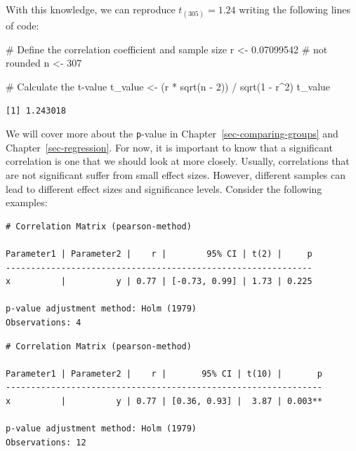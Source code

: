 \documentclass[
  letterpaper,
  DIV=11,
  numbers=noendperiod]{scrreprt}
\newenvironment{Shaded}{\begin{snugshade}}{\end{snugshade}}
\newcommand{\CommentTok}[1]{\textcolor[rgb]{0.37,0.37,0.37}{#1}}
\newcommand{\DecValTok}[1]{\textcolor[rgb]{0.68,0.00,0.00}{#1}}
\newcommand{\FloatTok}[1]{\textcolor[rgb]{0.68,0.00,0.00}{#1}}
\newcommand{\FunctionTok}[1]{\textcolor[rgb]{0.28,0.35,0.67}{#1}}
\newcommand{\NormalTok}[1]{\textcolor[rgb]{0.00,0.23,0.31}{#1}}
\newcommand{\OtherTok}[1]{\textcolor[rgb]{0.00,0.23,0.31}{#1}}
\newcommand{\SpecialCharTok}[1]{\textcolor[rgb]{0.37,0.37,0.37}{#1}}
\begin{document}
With this knowledge, we can reproduce \(t_{(305)} = 1.24\) writing the
following lines of code:

\begin{Shaded}
\begin{Highlighting}[]
\CommentTok{\# Define the correlation coefficient and sample size}
\NormalTok{r }\OtherTok{\textless{}{-}} \FloatTok{0.07099542} \CommentTok{\# not rounded}
\NormalTok{n }\OtherTok{\textless{}{-}} \DecValTok{307}

\CommentTok{\# Calculate the t{-}value}
\NormalTok{t\_value }\OtherTok{\textless{}{-}}\NormalTok{ (r }\SpecialCharTok{*} \FunctionTok{sqrt}\NormalTok{(n }\SpecialCharTok{{-}} \DecValTok{2}\NormalTok{)) }\SpecialCharTok{/} \FunctionTok{sqrt}\NormalTok{(}\DecValTok{1} \SpecialCharTok{{-}}\NormalTok{ r}\SpecialCharTok{\^{}}\DecValTok{2}\NormalTok{)}
\NormalTok{t\_value}
\end{Highlighting}
\end{Shaded}

\begin{verbatim}
[1] 1.243018
\end{verbatim}

We will cover more about the \texttt{p}-value in
Chapter~\ref{sec-comparing-groups} and Chapter~\ref{sec-regression}. For
now, it is important to know that a significant correlation is one that
we should look at more closely. Usually, correlations that are not
significant suffer from small effect sizes. However, different samples
can lead to different effect sizes and significance levels. Consider the
following examples:

\begin{verbatim}
# Correlation Matrix (pearson-method)

Parameter1 | Parameter2 |    r |        95% CI | t(2) |     p
-------------------------------------------------------------
x          |          y | 0.77 | [-0.73, 0.99] | 1.73 | 0.225

p-value adjustment method: Holm (1979)
Observations: 4
\end{verbatim}

\begin{verbatim}
# Correlation Matrix (pearson-method)

Parameter1 | Parameter2 |    r |       95% CI | t(10) |       p
---------------------------------------------------------------
x          |          y | 0.77 | [0.36, 0.93] |  3.87 | 0.003**

p-value adjustment method: Holm (1979)
Observations: 12
\end{verbatim}
\end{document}
